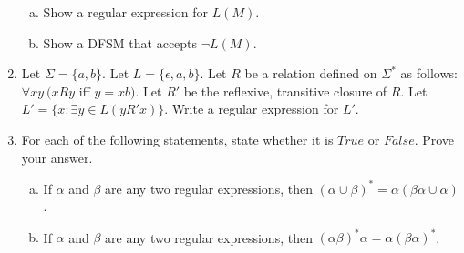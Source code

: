 \documentclass[10pt]{article}
\begin{document}
\begin{enumerate}[1)]
\begin{enumerate}[a)]
\item
Show a regular expression for $L(M)$.

\item
Show a DFSM that accepts $\lnot L(M)$.
\end{enumerate}

\addtocounter{enumi}{2}

\item
Let $\Sigma = \{a, b\}$.  Let $L = \{\epsilon, a, b\}$. Let $R$ be a relation defined on $\Sigma ^*$ as follows: $\forall xy\ (xRy$ iff $y = xb)$.  Let $R'$ be the reflexive, transitive closure of $R$.  Let $L' = \{x : \exists y \in L (yR'x)\}$.  Write a regular expression for $L'$.

\addtocounter{enumi}{1}
\item
For each of the following statements, state whether it is $True$ or $False$.  Prove your answer.

\begin{enumerate}[a)]
\addtocounter{enumii}{6}
\item
If $\alpha$ and $\beta$ are any two regular expressions, then $(\alpha \cup \beta)^* = \alpha(\beta\alpha \cup \alpha)$.

\item
If $\alpha$ and $\beta$ are any two regular expressions, then $(\alpha\beta)^*\alpha = \alpha(\beta\alpha)^*$.
\end{enumerate}
\end{enumerate}
\end{document}
